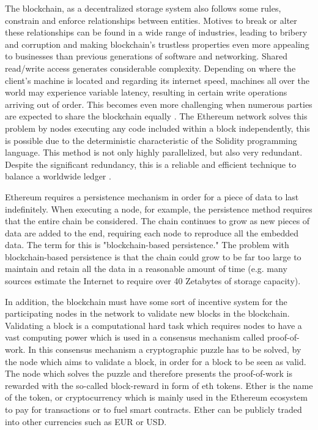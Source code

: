 The blockchain, as a decentralized storage system also follows some rules, constrain and enforce relationships between entities. Motives to break or alter these relationships can be found in a wide range of industries, leading to bribery and corruption and making blockchain's trustless properties even more appealing to businesses than previous generations of software and networking. Shared read/write access generates considerable complexity. Depending on where the client's machine is located and regarding its internet speed, machines all over the world may experience variable latency, resulting in certain write operations arriving out of order. This becomes even more challenging when numerous parties are expected to share the blockchain equally \cite[20]{dannen2017introducing}. The Ethereum network solves this problem by nodes executing any code included within a block independently, this is possible due to the deterministic characteristic of the Solidity programming language. This method is not only highly parallelized, but also very redundant. Despite the significant redundancy, this is a reliable and efficient technique to balance a worldwide ledger \cite[50]{dannen2017introducing}.

Ethereum requires a persistence mechanism in order for a piece of data to last indefinitely. When executing a node, for example, the persistence method requires that the entire chain be considered. The chain continues to grow as new pieces of data are added to the end, requiring each node to reproduce all the embedded data. The term for this is "blockchain-based persistence." The problem with blockchain-based persistence is that the chain could grow to be far too large to maintain and retain all the data in a reasonable amount of time (e.g. many sources estimate the Internet to require over 40 Zetabytes of storage capacity). 

In addition, the blockchain must have some sort of incentive system for the participating nodes in the network to validate new blocks in the blockchain. Validating a block is a computational hard task which requires nodes to have a vast computing power which is used in a consensus mechanism called proof-of-work. In this consensus mechanism a cryptographic puzzle has to be solved, by the node which aims to validate a block, in order for a block to be seen as valid. The node which solves the puzzle and therefore presents the proof-of-work is rewarded with the so-called block-reward in form of \acrlong{eth} tokens. Ether is the name of the token, or cryptocurrency which is mainly used in the Ethereum ecosystem to pay for transactions or to fuel smart contracts. Ether can be publicly traded into other currencies such as EUR or USD.

